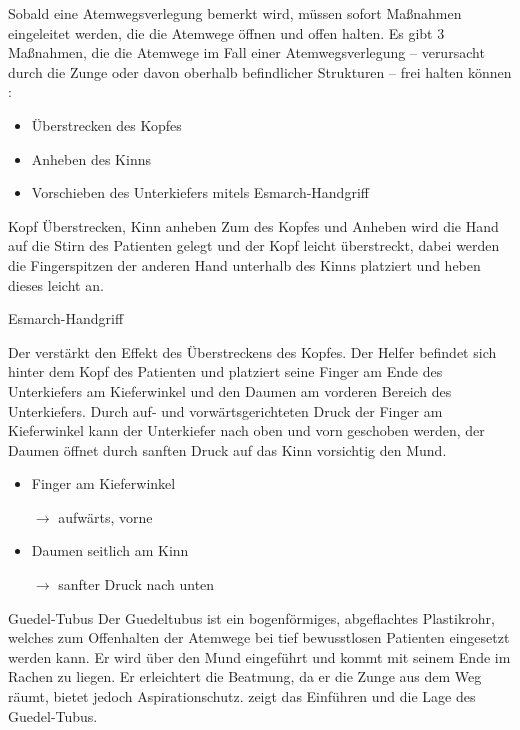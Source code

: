 Sobald eine Atemwegsverlegung bemerkt wird, müssen sofort
Maßnahmen eingeleitet werden, die die Atemwege öffnen und
offen halten. Es gibt 3 Maßnahmen, die die Atemwege im Fall
einer Atemwegsverlegung -- verursacht durch die Zunge oder
davon oberhalb befindlicher Strukturen -- frei halten
können \cite{Erc2010Sec4}:

\begin{itemize}
  \item Überstrecken des Kopfes 
  \item Anheben des Kinns
  \item Vorschieben des Unterkiefers
  mitels Esmarch-Handgriff
\end{itemize}

{Kopf Überstrecken, Kinn anheben}
{Zum  des Kopfes und Anheben wird die Hand
auf die Stirn des Patienten gelegt und der Kopf
leicht überstreckt, dabei werden die Fingerspitzen
der anderen Hand unterhalb des Kinns platziert und heben
dieses leicht an. \cite{Erc2010Sec4}}
{}
{}
{}
{}



{Esmarch-Handgriff}
{Der  verstärkt den Effekt des
Überstreckens des Kopfes. Der Helfer befindet sich hinter
dem Kopf des Patienten und platziert seine Finger
 am Ende des Unterkiefers am Kieferwinkel und
den Daumen am vorderen Bereich des Unterkiefers. Durch auf-
und vorwärtsgerichteten Druck der Finger am
Kieferwinkel kann der Unterkiefer nach oben und vorn
geschoben werden, der Daumen öffnet durch sanften Druck
auf das Kinn vorsichtig den Mund. \cite{Erc2010Sec4}

}
{
\begin{itemize}
  \item Finger
 am Kieferwinkel

$\rightarrow$ aufwärts, vorne
\item Daumen seitlich am Kinn

$\rightarrow$  sanfter Druck nach unten
\end{itemize}
}
{}
{}
{}

{Guedel-Tubus}
{
Der Guedeltubus ist ein bogenförmiges, abgeflachtes
Plastikrohr, welches zum Offenhalten der Atemwege bei tief
bewusstlosen Patienten eingesetzt werden kann. Er wird über
den Mund eingeführt und kommt mit seinem Ende im Rachen zu
liegen. Er erleichtert die Beatmung, da er die Zunge
aus dem Weg räumt, bietet jedoch 
Aspirationschutz. 
zeigt das Einführen und die Lage des Guedel-Tubus.
}
{}
{}
{}
{}

